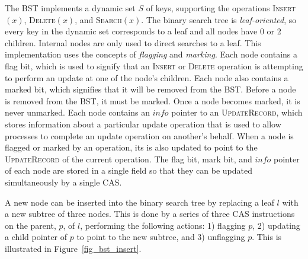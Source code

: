 \documentclass[letterpaper,twocolumn]{article}
\newcommand{\info}{\mathit{info}}
\begin{document}
The BST implements a dynamic set $S$ of keys, supporting the operations \textsc{Insert}$(x)$, \textsc{Delete}$(x)$, and \textsc{Search}$(x)$. The binary search tree is \textit{leaf-oriented}, so every key in the dynamic set corresponds to a leaf and all nodes have 0 or 2 children. Internal nodes are only used to direct searches to a leaf. This implementation uses the concepts of \textit{flagging} and \textit{marking}. Each node contains a flag bit, which is used to signify that an \textsc{Insert} or \textsc{Delete} operation is attempting to perform an update at one of the node's children. Each node also contains a marked bit, which signifies that it will be removed from the BST. Before a node is removed from the BST, it must be marked. Once a node becomes marked, it is never unmarked. Each node contains an $\info$ pointer to an \textsc{UpdateRecord}, which stores information about a particular update operation that is used to allow processes to complete an update operation on another's behalf. When a node is flagged or marked by an operation, its is also updated to point to the \textsc{UpdateRecord} of the current operation. The flag bit, mark bit, and $\info$ pointer of each node are stored in a single field so that they can be updated simultaneously by a single CAS.

A new node can be inserted into the binary search tree by replacing a leaf $l$ with a new subtree of three nodes. This is done by a series of three CAS instructions on the parent, $p$, of $l$, performing the following actions: 1) flagging $p$, 2) updating a child pointer of $p$ to point to the new subtree, and 3) unflagging $p$. This is illustrated in Figure~\ref{fig_bst_insert}. 
\end{document}
